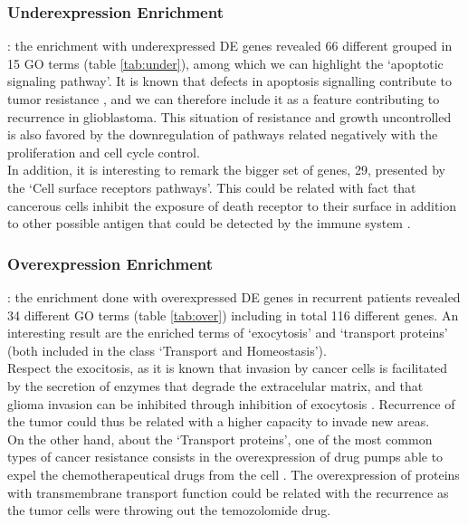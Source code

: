 \documentclass[9pt,twocolumn,twoside]{gsajnl}
\begin{document}
\subsubsection*{Underexpression Enrichment}: the enrichment with underexpressed DE genes revealed 66 different grouped in 15 GO terms (table \ref{tab:under}), among which we can highlight the `apoptotic signaling pathway'. It is known that defects in apoptosis signalling contribute to tumor resistance \citep{Debatin2004}, and we can therefore include it as a feature contributing to recurrence in glioblastoma. This situation of resistance and growth uncontrolled is also favored by the downregulation of pathways related negatively with the proliferation and cell cycle control.\\
In addition, it is interesting to remark the bigger set of genes, 29, presented by the `Cell surface receptors pathways'. This could be related with fact that cancerous cells inhibit the exposure of death receptor to their surface in addition to other possible antigen that could be detected by the immune system \citep{Ozoren2003}.

\subsubsection*{Overexpression Enrichment}: the enrichment done with overexpressed DE genes in recurrent patients revealed 34 different GO terms (table \ref{tab:over}) including in total 116 different genes. An interesting result are the enriched terms of `exocytosis' and `transport proteins' (both included in the class `Transport and Homeostasis').\\
Respect the exocitosis, as it is known that invasion by cancer cells is facilitated by the secretion of enzymes that degrade the extracelular matrix, and that glioma invasion can be inhibited through inhibition of exocytosis \citep{Liu2012}. Recurrence of the tumor could thus be related with a higher capacity to invade new areas.\\
On the other hand, about the `Transport proteins', one of the most common types of cancer resistance consists in the overexpression of drug pumps able to expel the chemotherapeutical drugs from the cell \citep{Borst2012}. The overexpression of proteins with transmembrane transport function could be related with the recurrence as the tumor cells were throwing out the temozolomide drug.
\end{document}
